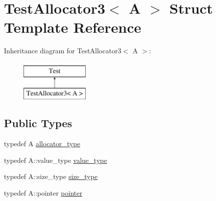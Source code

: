 \hypertarget{structTestAllocator3}{\section{Test\-Allocator3$<$ A $>$ Struct Template Reference}
\label{structTestAllocator3}
}
Inheritance diagram for Test\-Allocator3$<$ A $>$\-:\begin{figure}[H]
\begin{center}
\leavevmode
\includegraphics[height=2.000000cm]{structTestAllocator3}
\end{center}
\end{figure}
\subsection*{Public Types}
\begin{DoxyCompactItemize}
\item 
typedef A \hyperlink{structTestAllocator3_a2cbf292b14532b741aa9c2d29603cecd}{allocator\-\_\-type}
\item 
typedef A\-::value\-\_\-type \hyperlink{structTestAllocator3_ac5054dfad63609102029f3bda09f70fc}{value\-\_\-type}
\item 
typedef A\-::size\-\_\-type \hyperlink{structTestAllocator3_a123816b6d7f35344795ee12a478658d8}{size\-\_\-type}
\item 
typedef A\-::pointer \hyperlink{structTestAllocator3_a1e00e0a73b38d61279e77535325b2124}{pointer}
\end{DoxyCompactItemize}


